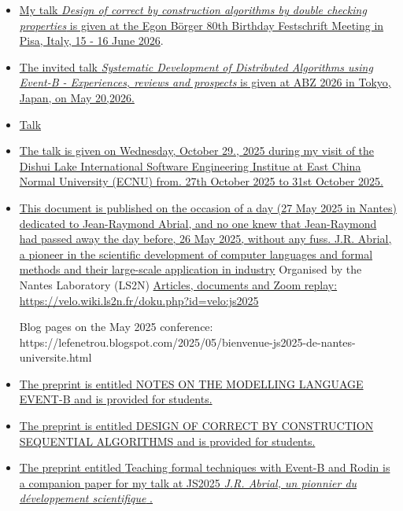 \documentclass[ 12pt]{article}
\begin{document}
\begin{itemize}

  
\item[] \href{https://mery54.github.io/mery/publications/talk-egon80.pdf}{
My  talk  \textit{Design of  correct by construction  algorithms by double 
  checking  properties} is
given at  the Egon B\"{o}rger  80th Birthday Festschrift   Meeting in
Pisa, Italy, 15 - 16 June 2026}.

\item[] \href{https://conf.researchr.org/program/fm-2026/program-fm-2026/?past=Show%20upcoming%20events%20only}{
The  invited talk  \textit{	Systematic Development of Distributed
  Algorithms using Event-B - Experiences, reviews and prospects} is
given at ABZ 2026  in  Tokyo, Japan,  on May 20,2026.}

\item[] \href{https://mery54.github.io/mery/talk-abz.pdf}{Talk}
  
  \item[]
  \href{https://mery54.github.io/mery/talks/talk-shanghai.pdf}{The
    talk  is given on Wednesday, October 29., 2025  during my visit of the Dishui Lake International Software
  Engineering Institue   at
East China Normal University (ECNU) from. 27th October 2025 to 31st October 2025. }

\item[]
  \href{https://mery54.github.io/mery/publications/final-nantes27052025.pdf}{This
document is published on the occasion of a day (27 May 2025 in
Nantes) dedicated to
Jean-Raymond Abrial, and no one knew that Jean-Raymond had
passed away the day before, 26 May 2025, without any
fuss. J.R. Abrial, a pioneer in the scientific development of computer
languages and formal methods and their large-scale application in
industry}
Organised by the Nantes  Laboratory (LS2N)
\href{https://velo.wiki.ls2n.fr/doku.php?id=velo:js2025}{Articles,
  documents and Zoom replay:   https://velo.wiki.ls2n.fr/doku.php?id=velo:js2025}

Blog pages on the May 2025 conference:
https://lefenetrou.blogspot.com/2025/05/bienvenue-js2025-de-nantes-universite.html


  \item[]
  \href{https://mery54.github.io/mery/publications/preprint-chaptereventb.pdf}{The
    preprint is  entitled \textsf{NOTES ON THE MODELLING LANGUAGE EVENT-B}  and is provided for students.}


  
\item[]
  \href{https://mery54.github.io/mery/publications/preprint-chapterseqalgo.pdf}{The
    preprint is  entitled \textsf{DESIGN OF CORRECT BY CONSTRUCTION
      SEQUENTIAL ALGORITHMS}  and is provided for students.}


  
\item[]
  \href{https://mery54.github.io/mery/publications/final-nantes27052025.pdf}{
    The preprint entitled \textsf{Teaching formal techniques  with Event-B  and 
  Rodin} is  a companion paper for my talk at JS2025 \textit{J.R. Abrial, un pionnier du développement scientifique }.}
    
\end{itemize}
\end{document}
